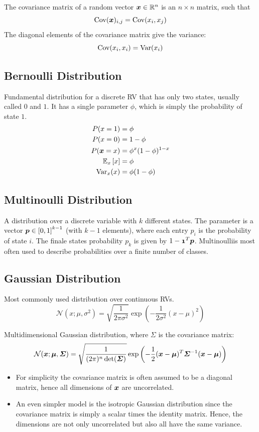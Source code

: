 \begin{multicols}{2}
	The covariance matrix of a random vector $\bol{x}\in \mathbb{R}^n$ is an $n\times n$ matrix, such that
	\[ \cov(\bol{x})_{i,j}=\cov(x_i,x_j) \]
	The diagonal elements of the covariance matrix give the variance:
	\[ \text{Cov}(x_i,x_i) = \text{Var}(x_i) \]
	
	\subsection{Bernoulli Distribution}
	Fundamental distribution for a discrete RV that has only two states, usually called $0$ and $1$.
	It has a single parameter $\phi$, which is simply the probability of state $1$.
	\begin{align*}
	P(x=1) &= \phi \\
	P(x=0) &= 1-\phi\\
	P(\bol{x}=x) &= \phi^x(1-\phi)^{1-x}\\
	\Exp_x\left[x\right] &= \phi\\
	\var_x(x) &= \phi(1-\phi)
	\end{align*}
	
	\subsection{Multinoulli Distribution}
	A distribution over a discrete variable with $k$ different states.
	The parameter is a vector $\bol{p} \in \left[0,1\right]^{k-1}$ (with $k-1$ elements), where each entry $p_i$ is the probability of state $i$.
	The finale states probability $p_k$ is given by $1-\bol{1}^T\bol{p}$.
	Multinoulliis most often used to describe probabilities over a finite number of classes.
	
	\subsection{Gaussian Distribution}
	Most commonly used distribution over continuous RVs.
	\[ \mathcal{N}(x;\mu,\sigma^2) = \sqrt{\frac{1}{2\pi\sigma^2}}\exp\left(-\frac{1}{2\sigma^2}(x-\mu)^2\right) \]
	
	Multidimensional Gaussian distribution, where $\Sigma$ is the covariance matrix:
	\[ \mathcal{N}(\bol{x}; \bol{\mu},\bol{\Sigma}) = 
	\sqrt{\frac{1}{(2\pi)^n\det(\bol{\Sigma})}} 
	\exp \left( -\frac{1}{2} (\bol{x}-\bol{\mu})^T\bol{\Sigma}^{-1}(\bol{x}-\bol{\mu}) \right) \]
	
	\begin{itemize}
		\item For simplicity the covariance matrix is often assumed to be a diagonal matrix, hence all dimensions of $\bol{x}$ are uncorrelated.
		\item An even simpler model is the isotropic Gaussian distribution since the covariance matrix is simply a scalar times the identity matrix. Hence, the dimensions are not only uncorrelated but also all have the same variance.
	\end{itemize}
	

\end{multicols}
